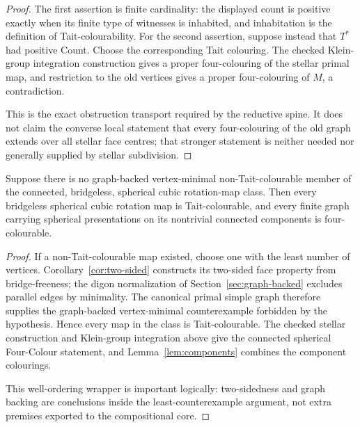 \begin{proof}
The first assertion is finite cardinality: the displayed count is positive
exactly when its finite type of witnesses is inhabited, and inhabitation is
the definition of Tait-colourability.  For the second assertion, suppose
instead that \(T^{*}\) had positive Count.  Choose the corresponding Tait
colouring.  The checked Klein-group integration construction gives a proper
four-colouring of the stellar primal map, and restriction to the old vertices
gives a proper four-colouring of \(M\), a contradiction.

This is the exact obstruction transport required by the reductive spine.  It
does not claim the converse local statement that every four-colouring of the
old graph extends over all stellar face centres; that stronger statement is
neither needed nor generally supplied by stellar subdivision.
\end{proof}

\begin{theorem}
\label{thm:spherical-headline-from-no-minimal}
Suppose there is no graph-backed vertex-minimal non-Tait-colourable member of
the connected, bridgeless, spherical cubic rotation-map class.  Then every
bridgeless spherical cubic rotation map is Tait-colourable, and every finite
graph carrying spherical presentations on its nontrivial connected
components is four-colourable.
\end{theorem}

\begin{proof}
If a non-Tait-colourable map existed, choose one with the least number of
vertices.  Corollary~\ref{cor:two-sided} constructs its two-sided face
property from bridge-freeness; the digon normalization of
Section~\ref{sec:graph-backed} excludes parallel edges by minimality.  The
canonical primal simple graph therefore supplies the graph-backed
vertex-minimal counterexample forbidden by the hypothesis.  Hence every map
in the class is Tait-colourable.  The checked stellar construction and
Klein-group integration above give the connected spherical Four-Colour
statement, and Lemma~\ref{lem:components} combines the component colourings.

This well-ordering wrapper is important logically: two-sidedness and graph
backing are conclusions inside the least-counterexample argument, not extra
premises exported to the compositional core.
\end{proof}

